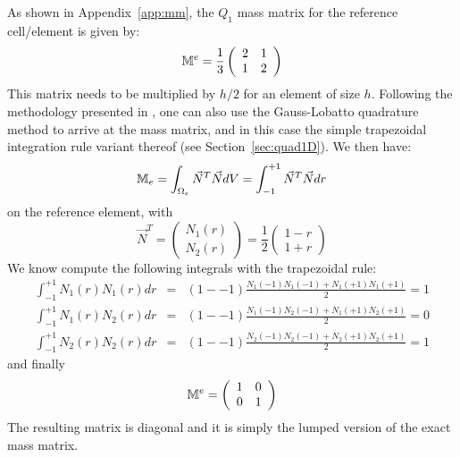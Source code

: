 As shown in Appendix~\ref{app:mm}, the $Q_1$ mass matrix for the reference cell/element is given by:
\[
{{\mathbb{M}}}^e=
\frac{1}{3}
\left(
\begin{array}{cc}
2 & 1 \\ 1 & 2
\end{array}
\right)
\]
This matrix needs to be multiplied by $h/2$ for an element of size $h$.
Following the methodology presented in \cite{zhgh93}, one can also use the Gauss-Lobatto 
quadrature method to arrive at the mass matrix, and in this case the simple trapezoidal 
integration rule variant thereof (see Section~\ref{sec:quad1D}).
We then have:
\begin{equation}
{{\mathbb{M}}}_e=\int_{\Omega_e} \vec{N}^T \vec{N} dV
= \int_{-1}^{+1} \vec{N}^T \vec{N} dr
\end{equation}
on the reference element, with 
\[
{\vec N}^T = 
\left(
\begin{array}{c}
N_1(r) \\ N_2(r)
\end{array}
\right)
=
\frac{1}{2}
\left(
\begin{array}{c}
1-r \\ 1+r
\end{array}
\right)
\]
We know compute the following integrals with the trapezoidal rule:
\begin{eqnarray}
\int_{-1}^{+1} N_1(r) N_1(r) dr &=& (1--1) \frac{N_1(-1) N_1(-1)  + N_1(+1) N_1(+1) }{2} = 1 \\
\int_{-1}^{+1} N_1(r) N_2(r) dr &=& (1--1) \frac{N_1(-1) N_2(-1)  + N_1(+1) N_2(+1) }{2} = 0 \\
\int_{-1}^{+1} N_2(r) N_2(r) dr &=& (1--1) \frac{N_2(-1) N_2(-1)  + N_2(+1) N_2(+1) }{2} = 1 
\end{eqnarray}
and finally 
\[
{{\mathbb{M}}}^e=
\left(
\begin{array}{cc}
1 & 0 \\ 0 & 1
\end{array}
\right)
\]
The resulting matrix is diagonal and it is simply the lumped version of the exact mass matrix. 






